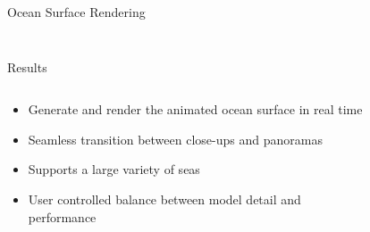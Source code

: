 \documentclass[final,hyperref={pdfpagelabels=true}]{beamer}
\begin{document}
\begin{frame}
\begin{center}
\begin{minipage}{0.99\textwidth}
\begin{block}{Ocean Surface Rendering}
\begin{columns}[t]
\begin{column}{0.95\linewidth}
\begin{figure}
					\end{figure}
				\end{column}
%					
%					
%					
%					
%					
			\end{columns}
		\end{block}
	\end{minipage}
	\begin{minipage}{0.99\textwidth}
		\begin{block}{Results}
			\begin{columns}[t]
				\begin{column}{0.4\linewidth}
				\begin{itemize}
				\item Generate and render the animated ocean surface in real time
				\item Seamless transition between close-ups and panoramas
				\item Supports a large variety of seas
				\item User controlled balance between model detail and performance
				\end{itemize}
				\end{column}
				\begin{column}{0.5\linewidth}
				\begin{figure}
				\centering

\end{figure}
\end{column}
\end{columns}
\end{block}
\end{minipage}
\end{center}
\end{frame}
\end{document}

